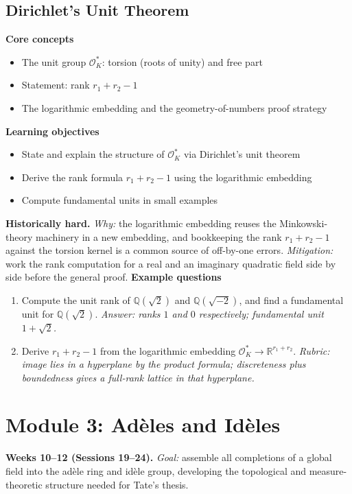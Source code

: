 \documentclass[11pt]{article}
\newcommand{\Q}{\mathbb{Q}}
\newcommand{\OK}{\mathcal{O}_K}
\begin{document}
\subsection{Dirichlet's Unit Theorem}
\textbf{Core concepts}
\begin{itemize}[noitemsep]
  \item The unit group $\OK^*$: torsion (roots of unity) and free part
  \item Statement: rank $r_1 + r_2 - 1$
  \item The logarithmic embedding and the geometry-of-numbers proof strategy
\end{itemize}
\textbf{Learning objectives}
\begin{itemize}[noitemsep]
  \item State and explain the structure of $\OK^*$ via Dirichlet's unit theorem
  \item Derive the rank formula $r_1+r_2-1$ using the logarithmic embedding
  \item Compute fundamental units in small examples
\end{itemize}
\textbf{Historically hard.} \emph{Why:} the logarithmic embedding reuses the Minkowski-theory machinery in a new embedding, and bookkeeping the rank $r_1+r_2-1$ against the torsion kernel is a common source of off-by-one errors. \emph{Mitigation:} work the rank computation for a real and an imaginary quadratic field side by side before the general proof.
\textbf{Example questions}
\begin{enumerate}[noitemsep]
  \item[Q1 (foundational).] Compute the unit rank of $\Q(\sqrt2)$ and $\Q(\sqrt{-2})$, and find a fundamental unit for $\Q(\sqrt2)$. \emph{Answer: ranks $1$ and $0$ respectively; fundamental unit $1+\sqrt2$.}
  \item[Q2 (advanced).] Derive $r_1+r_2-1$ from the logarithmic embedding $\OK^*\to \mathbb{R}^{r_1+r_2}$. \emph{Rubric: image lies in a hyperplane by the product formula; discreteness plus boundedness gives a full-rank lattice in that hyperplane.}
\end{enumerate}

\section{Module 3: Adèles and Idèles}
\textbf{Weeks 10--12 (Sessions 19--24).} \textit{Goal:} assemble all completions of a global field into the adèle ring and idèle group, developing the topological and measure-theoretic structure needed for Tate's thesis.
\end{document}
